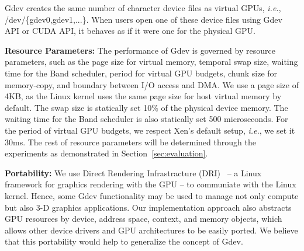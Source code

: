 Gdev creates the same number of character device files as virtual GPUs,
\textit{i.e.}, /dev/\{gdev0,gdev1,...\}.
When users open one of these device files using Gdev API or CUDA API,
it behaves as if it were one for the physical GPU.

\textbf{Resource Parameters:}
The performance of Gdev is governed by resource parameters, such as the
page size for virtual memory, temporal swap size, waiting time for the
Band scheduler, period for virtual GPU budgets, chunk size
for memory-copy, and boundary between I/O access and DMA.
We use a page size of 4KB, as the Linux kernel uses the same page size
for host virtual memory by default.
The swap size is statically set 10\% of the physical device memory.
The waiting time for the Band scheduler is also statically set 500
microseconds.
For the period of virtual GPU budgets, we respect Xen's default setup,
\textit{i.e.}, we set it 30ms.
The rest of resource parameters will be determined through the experiments as
demonstrated in Section~\ref{sec:evaluation}.

\textbf{Portability:}
We use Direct Rendering Infrastracture (DRI)~\cite{DRI} -- a Linux
framework for graphics rendering with the GPU -- to communiate with the
Linux kernel.
Hence, some Gdev functionality may be used to manage not only compute
but also 3-D graphics applications.
Our implementation approach also abstracts GPU resources by device,
address space, context, and memory objects, which allows other device
drivers and GPU architectures to be easily ported.
We believe that this portability would help to generalize the concept of
Gdev. 

